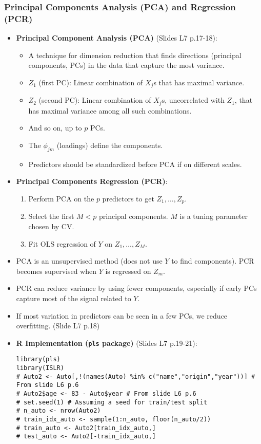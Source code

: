 \documentclass[12pt,a4paper]{article}
\newcommand{\Rpackage}[1]{\texttt{#1}} %
\begin{document}
\begin{itemize}
    \subsubsection{Principal Components Analysis (PCA) and Regression (PCR) }
        \begin{itemize}
            \item \textbf{Principal Component Analysis (PCA)} (Slides L7 p.17-18):
                \begin{itemize}
                    \item A technique for dimension reduction that finds directions (principal components, PCs) in the data that capture the most variance.
                    \item $Z_1$ (first PC): Linear combination of $X_j$s that has maximal variance.
                    \item $Z_2$ (second PC): Linear combination of $X_j$s, uncorrelated with $Z_1$, that has maximal variance among all such combinations.
                    \item And so on, up to $p$ PCs.
                    \item The $\phi_{jm}$ (loadings) define the components.
                    \item Predictors should be standardized before PCA if on different scales.
                \end{itemize}
            \item \textbf{Principal Components Regression (PCR)}:
                \begin{enumerate}
                    \item Perform PCA on the $p$ predictors to get $Z_1, \dots, Z_p$.
                    \item Select the first $M < p$ principal components. $M$ is a tuning parameter chosen by CV.
                    \item Fit OLS regression of $Y$ on $Z_1, \dots, Z_M$.
                \end{enumerate}
            \item PCA is an unsupervised method (does not use $Y$ to find components). PCR becomes supervised when $Y$ is regressed on $Z_m$.
            \item PCR can reduce variance by using fewer components, especially if early PCs capture most of the signal related to $Y$.
            \item If most variation in predictors can be seen in a few PCs, we reduce overfitting. (Slide L7 p.18)
            \item \textbf{R Implementation (\Rpackage{pls} package)} (Slides L7 p.19-21):
\begin{lstlisting}[caption={PCR Example (Auto Data, Slides L7 p.19, 21)}]
library(pls)
library(ISLR)
# Auto2 <- Auto[,!(names(Auto) %in% c("name","origin","year"))] # From slide L6 p.6
# Auto2$age <- 83 - Auto$year # From slide L6 p.6
# set.seed(1) # Assuming a seed for train/test split
# n_auto <- nrow(Auto2)
# train_idx_auto <- sample(1:n_auto, floor(n_auto/2))
# train_auto <- Auto2[train_idx_auto,]
# test_auto <- Auto2[-train_idx_auto,]


\end{lstlisting}
\end{itemize}
\end{itemize}
\end{document}
